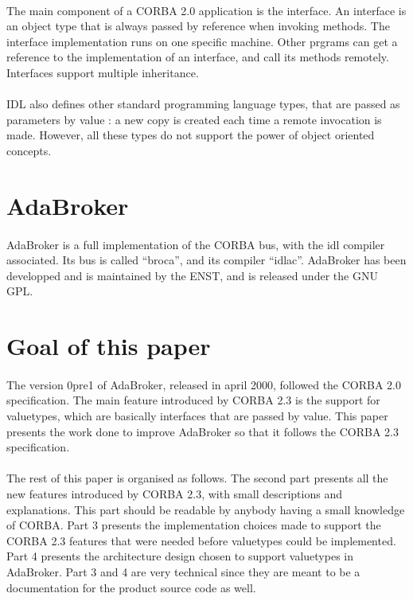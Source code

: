 \paragraph{}The main component of a CORBA 2.0 application is the
interface. An interface is an object type that is always passed by
reference when invoking methods. The interface implementation runs on
one specific machine. Other prgrams can get a reference to the
implementation of an interface, and call its methods remotely.
Interfaces support multiple inheritance.

\paragraph{}IDL also defines other standard programming language
types, that are passed as parameters by value : a new copy is created
each time a remote invocation is made. However, all these types do not
support the power of object oriented concepts.


\section{AdaBroker}

\paragraph{}AdaBroker is a full implementation of the CORBA bus, with the idl
compiler associated. Its bus is called ``broca'', and its compiler
``idlac''. AdaBroker has been developped and is maintained by the
ENST, and is released under the GNU GPL.

\section{Goal of this paper}
\paragraph{}The version 0pre1 of AdaBroker, released in april 2000,
followed the CORBA 2.0 specification. The main feature introduced by
CORBA 2.3 is the support for valuetypes, which are basically
interfaces that are passed by value. This paper presents the work done
to improve AdaBroker so that it follows the CORBA 2.3 specification. 

\paragraph{} The rest of this paper is organised as follows. The
second part presents all the new features introduced by CORBA 2.3,
with small descriptions and explanations. This part should be readable
by anybody having a small knowledge of CORBA. Part 3 presents the
implementation choices made to support the CORBA 2.3 features that were needed before
valuetypes could be implemented. Part 4 presents the architecture design chosen to
support valuetypes in AdaBroker. Part 3 and 4 are very technical since
they are meant to be a documentation for the product source code as well.

